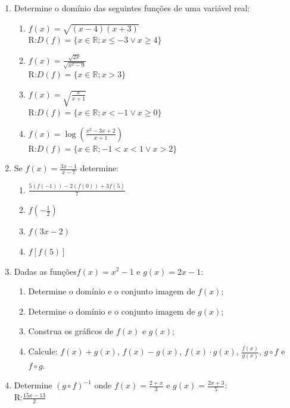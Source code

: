 \documentclass[oneside,a4paper,12pt]{article}
\begin{document}
\begin{enumerate}
	\item Determine o domínio das seguintes funções de uma variável real:
	\begin{multicols}{2}
		\begin{enumerate}
			\item $f(x) = \sqrt{(x-4)(x+3)}$ \\ R:$D(f)=\{x \in \mathbb{R}; x \leq -3 \lor x \geq 4 \}$
			\item $f(x) = \frac{\sqrt{2x}}{\sqrt{x^2 - 9}}$ \\ R:$D(f)=\{x \in \mathbb{R}; x > 3\}$
			\item $f(x) = \sqrt{\frac{x}{x+1}}$ \\ R:$D(f)=\{x \in \mathbb{R}; x < -1 \lor x \geq 0 \}$
			\item $f(x) = \log(\frac{x^{2}-3x+2}{x+1})$ \\ R:$D(f)=\{x \in \mathbb{R}; -1 < x < 1 \lor x>2 \}$
		\end{enumerate}
	\end{multicols}
	
	\item Se $f(x) = \frac{3x-1}{x-7}$ determine:
	\begin{multicols}{2}
		\begin{enumerate}
			\item $\frac{5(f(-1))-2(f(0))+3f(5)}{7}$
			\item $f(-\frac{1}{2})$
			\item $f(3x-2)$
			\item $f[f(5)]$
		\end{enumerate}
	\end{multicols}
	
	\item Dadas as funções$f(x) = x^2 -1$ e $g(x) = 2x -1$:
	\begin{multicols}{2}
		\begin{enumerate}
			\item Determine o domínio e o conjunto imagem de $f(x)$;
			\item Determine o domínio e o conjunto imagem de $g(x)$;
			\item Construa os gráficos de $f(x)$ e $g(x)$;
			\item Calcule: $f(x) + g(x)$, $f(x) - g(x)$, $f(x) \cdot g(x)$, $\frac{f(x)}{g(x)}$, $g \circ f$ e $f \circ g$.
		\end{enumerate}
	\end{multicols}
	
	
	\item Determine $(g \circ f)^{-1}$ onde $f(x) = \frac{2+x}{3}$ e $g(x) = \frac{2x+3}{5}$: \\ R:$\frac{15x-13}{2}$


\end{enumerate}
\end{document}
